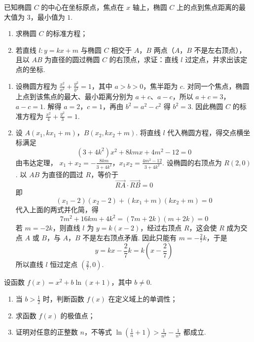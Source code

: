 \begin{problem}
已知椭圆 \(C\) 的中心在坐标原点，焦点在 \(x\) 轴上，椭圆 \(C\) 上的点到焦点距离的最大值为 \(3\)，最小值为 \(1\).

\begin{enumerate}
\item 求椭圆 \(C\) 的标准方程；
\item 若直线 \(l: y = kx + m\) 与椭圆 \(C\) 相交于 \(A\)，\(B\) 两点（\(A\)，\(B\) 不是左右顶点），且以 \(AB\) 为直径的圆过椭圆 \(C\) 的右顶点，求证：直线 \(l\) 过定点，并求出该定点的坐标.
\end{enumerate}
\end{problem}

\begin{solution}
\begin{enumerate}
\item 设椭圆方程为 \(\frac{x^2}{a^2}+\frac{y^2}{b^2}=1\)，其中 \(a>b>0\)，焦半距为 \(c\). 对同一个焦点，椭圆上点到该焦点的最大、最小距离分别为 \(a+c\)、\(a-c\)，所以
\(a+c=3\)，\(a-c=1\).
解得 \(a=2\)，\(c=1\)，再由 \(b^2=a^2-c^2\) 得 \(b^2=3\). 因此椭圆 \(C\) 的标准方程为 \(\frac{x^2}{4}+\frac{y^2}{3}=1\).
\item 设 \(A(x_1,kx_1+m)\)，\(B(x_2,kx_2+m)\). 将直线 \(l\) 代入椭圆方程，得交点横坐标满足
\[
(3+4k^2)x^2+8kmx+4m^2-12=0
\]
由韦达定理，
\(x_1+x_2=-\frac{8km}{3+4k^2}\)，\(x_1x_2=\frac{4m^2-12}{3+4k^2}\).
设椭圆的右顶点为 \(R(2,0)\). 以 \(AB\) 为直径的圆过 \(R\)，等价于
\[
\overrightarrow{RA}\cdot\overrightarrow{RB}=0
\]
即
\[
(x_1-2)(x_2-2)+(kx_1+m)(kx_2+m)=0
\]
代入上面的两式并化简，得
\[
7m^2+16km+4k^2=(7m+2k)(m+2k)=0
\]
若 \(m=-2k\)，则直线 \(l\) 为 \(y=k(x-2)\)，经过右顶点 \(R\)，这会使 \(R\) 成为交点 \(A\) 或 \(B\)，与 \(A\)，\(B\) 不是左右顶点矛盾. 因此只能有 \(m=-\frac{2}{7}k\)，于是
\[
y=kx-\frac{2}{7}k=k\left(x-\frac{2}{7}\right)
\]
所以直线 \(l\) 恒过定点 \(\left(\frac{2}{7},0\right)\).
\end{enumerate}
\end{solution}

\begin{problem}
设函数 \( f(x) = x^{2} + b \ln (x + 1) \)，其中 \( b \neq 0 \).

\begin{enumerate}
\item 当 \(b > \frac{1}{2}\) 时，判断函数 \(f(x)\) 在定义域上的单调性；
\item 求函数 \( f(x) \) 的极值点；
\item 证明对任意的正整数 \(n\)，不等式 \(\ln \left(\frac{1}{n} + 1\right) > \frac{1}{n^2} - \frac{1}{n^3}\) 都成立.
\end{enumerate}
\end{problem}

